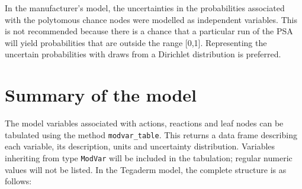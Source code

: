 \documentclass[
]{article}
\begin{document}
In the manufacturer's model, the uncertainties in the probabilities
associated with the polytomous chance nodes were modelled as independent
variables. This is not recommended because there is a chance that a
particular run of the PSA will yield probabilities that are outside the
range {[}0,1{]}. Representing the uncertain probabilities with draws
from a Dirichlet distribution is preferred.

\hypertarget{summary-of-the-model}{%
\section{Summary of the model}\label{summary-of-the-model}}

The model variables associated with actions, reactions and leaf nodes
can be tabulated using the method \texttt{modvar\_table}. This returns a
data frame describing each variable, its description, units and
uncertainty distribution. Variables inheriting from type \texttt{ModVar}
will be included in the tabulation; regular numeric values will not be
listed. In the Tegaderm model, the complete structure is as follows:
\end{document}
